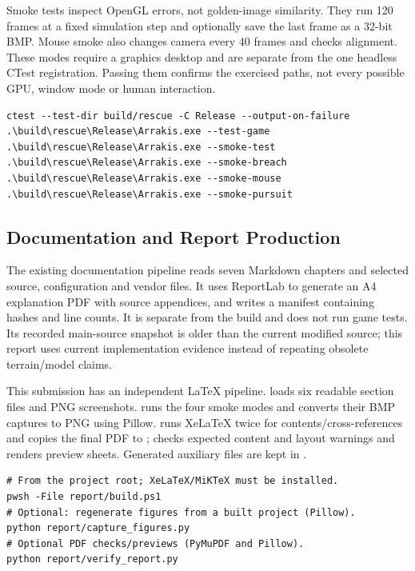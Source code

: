 Smoke tests inspect OpenGL errors, not golden-image similarity. They run 120 frames at a fixed simulation step and optionally save the last frame as a 32-bit BMP. Mouse smoke also changes camera every 40 frames and checks alignment. These modes require a graphics desktop and are separate from the one headless CTest registration. Passing them confirms the exercised paths, not every possible GPU, window mode or human interaction.
\begin{lstlisting}
ctest --test-dir build/rescue -C Release --output-on-failure
.\build\rescue\Release\Arrakis.exe --test-game
.\build\rescue\Release\Arrakis.exe --smoke-test
.\build\rescue\Release\Arrakis.exe --smoke-breach
.\build\rescue\Release\Arrakis.exe --smoke-mouse
.\build\rescue\Release\Arrakis.exe --smoke-pursuit
\end{lstlisting}

\subsection{Documentation and Report Production}
The existing documentation pipeline reads seven Markdown chapters and selected source, configuration and vendor files. It uses ReportLab to generate an A4 explanation PDF with source appendices, and writes a manifest containing hashes and line counts. It is separate from the build and does not run game tests. Its recorded main-source snapshot is older than the current modified source; this report uses current implementation evidence instead of repeating obsolete terrain/model claims.

This submission has an independent LaTeX pipeline.  loads six readable section files and PNG screenshots.  runs the four smoke modes and converts their BMP captures to PNG using Pillow.  runs XeLaTeX twice for contents/cross-references and copies the final PDF to ;  checks expected content and layout warnings and renders preview sheets. Generated auxiliary files are kept in .
\begin{lstlisting}
# From the project root; XeLaTeX/MiKTeX must be installed.
pwsh -File report/build.ps1
# Optional: regenerate figures from a built project (Pillow).
python report/capture_figures.py
# Optional PDF checks/previews (PyMuPDF and Pillow).
python report/verify_report.py
\end{lstlisting}
